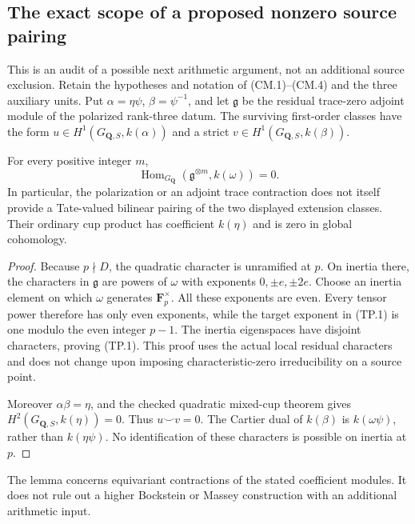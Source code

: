 \subsection{The exact scope of a proposed nonzero source pairing}
\label{sec:kt-actual-source-pairing-audit}

This is an audit of a possible next arithmetic argument, not an
additional source exclusion.  Retain the hypotheses and notation
of (CM.1)--(CM.4) and the three auxiliary units.  Put
\(\alpha=\eta\psi\), \(\beta=\psi^{-1}\), and let
\(\mathfrak g\) be the residual trace-zero adjoint module of
the polarized rank-three datum.  The surviving first-order
classes have the form
\(u\in H^1(G_{\mathbf Q,S},k(\alpha))\) and a strict
\(v\in H^1(G_{\mathbf Q,S},k(\beta))\).

\begin{lemma}
For every positive integer \(m\),
\[
 \operatorname{Hom}_{G_{\mathbf Q}}
       (\mathfrak g^{\otimes m},k(\omega))=0.
 \tag{TP.1}
\]
In particular, the polarization or an adjoint trace contraction
does not itself provide a Tate-valued bilinear pairing of the
two displayed extension classes.  Their ordinary cup product
has coefficient \(k(\eta)\) and is zero in global cohomology.
\end{lemma}
\begin{proof}
Because \(p\nmid D\), the quadratic character is unramified
at \(p\).  On inertia there, the characters in
\(\mathfrak g\) are powers of \(\omega\) with exponents
\(0,\pm e,\pm2e\).  Choose an inertia element on which
\(\omega\) generates \(\mathbf F_p^\times\).
All these exponents are even.  Every tensor power therefore
has only even exponents, while the target exponent in (TP.1)
is one modulo the even integer \(p-1\).  The inertia
eigenspaces have disjoint characters, proving (TP.1).
This proof uses the actual local residual characters and
does not change upon imposing characteristic-zero
irreducibility on a source point.

Moreover \(\alpha\beta=\eta\), and the checked
quadratic mixed-cup theorem gives
\(H^2(G_{\mathbf Q,S},k(\eta))=0\).
Thus \(u\smile v=0\).  The Cartier dual of
\(k(\beta)\) is \(k(\omega\psi)\), rather than
\(k(\eta\psi)\).  No identification of these
characters is possible on inertia at \(p\).
\end{proof}

The lemma concerns equivariant contractions of the stated
coefficient modules.  It does not rule out a higher
Bockstein or Massey construction with an additional
arithmetic input.


